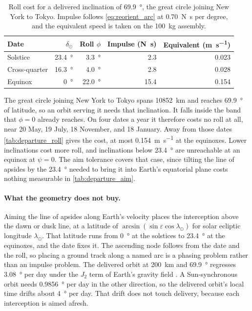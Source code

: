 \documentclass{article}
\begin{document}
\begin{table}[!htpb]
    \centering
    \caption{Roll cost for a delivered inclination of \SI{69.9}{\degree}, the great circle joining New York to Tokyo. Impulse follows \autoref{eq:reorient_arc} at \SI{0.70}{\newton\second} per degree, and the equivalent speed is taken on the \SI{100}{\kilo\gram} assembly.}
    \label{tab:departure_roll}
    \begin{tabular}{|l|r|r|r|r|}
        \hline
        Date & $\delta_\odot$ & Roll $\phi$ & Impulse (\si{\newton\second}) & Equivalent (\si{\meter\per\second}) \\\hline
        Solstice & \SI{23.4}{\degree} & \SI{3.3}{\degree} & 2.3 & 0.023 \\\hline
        Cross-quarter & \SI{16.3}{\degree} & \SI{4.0}{\degree} & 2.8 & 0.028 \\\hline
        Equinox & \SI{0}{\degree} & \SI{22.0}{\degree} & 15.4 & 0.154 \\\hline
    \end{tabular}
\end{table}

The great circle joining New York to Tokyo spans \SI{10852}{\kilo\meter} and reaches \SI{69.9}{\degree} of latitude, so an orbit serving it needs that inclination. It falls inside the band that $\phi = 0$ already reaches. On four dates a year it therefore costs no roll at all, near \num{20} May, \num{19} July, \num{18} November, and \num{18} January. Away from those dates \autoref{tab:departure_roll} gives the cost, at most \SI{0.154}{\meter\per\second} at the equinoxes. Lower inclinations cost more roll, and inclinations below \SI{23.4}{\degree} are unreachable at an equinox at $\psi = 0$. The aim tolerance covers that case, since tilting the line of apsides by the \SI{23.4}{\degree} needed to bring it into Earth's equatorial plane costs nothing measurable in \autoref{tab:departure_aim}.

\paragraph{What the geometry does not buy.}
Aiming the line of apsides along Earth's velocity places the interception above the dawn or dusk line, at a latitude of $\arcsin(\sin\varepsilon\cos\lambda_\odot)$ for solar ecliptic longitude $\lambda_\odot$. That latitude runs from \SI{0}{\degree} at the solstices to \SI{23.4}{\degree} at the equinoxes, and the date fixes it. The ascending node follows from the date and the roll, so placing a ground track along a named arc is a phasing problem rather than an impulse problem. The delivered orbit at \SI{200}{\kilo\meter} and \SI{69.9}{\degree} regresses \SI{3.08}{\degree} per day under the $J_2$ term of Earth's gravity field \cite{vallado_astrodynamics}. A Sun-synchronous orbit needs \SI{0.9856}{\degree} per day in the other direction, so the delivered orbit's local time drifts about \SI{4}{\degree} per day. That drift does not touch delivery, because each interception is aimed afresh.
\end{document}
